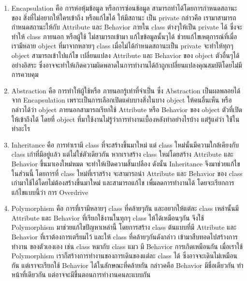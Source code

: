 \begin{enumerate}
\item Encapsulation คือ การห่อหุ้มข้อมูล หรือการซ่อนข้อมูล สามารถทำได้โดยการกำหนดสถานะของ สิ่งที่ไม่อยากให้ใครเข้าถึง หรือแก้ไขได้ ให้มีสถานะ
เป็น private กล่าวคือ เรามาสามารถกำหนดสถานะให้กับ Attribute และ Behavior ภายใน class ต่างๆให้เป็น private ได้ ซึ่งจะทำให้ class ภายนอก หรือผู้ใช้ ไม่สามารถเข้ามา
แก้ไขข้อมูลนั้นๆได้ ช่วยแก้ไขเหตุการณ์ที่เมื่อเรามีหลาย object ที่มาจากหลายๆ class เมื่อไม่ได้กำหนดสถานะเป็น private จะทำให้ทุกๆ object สามารถเข้าไปแก้ไข เปลี่ยนแปลง Attribute 
และ Behavior ของ object ตัวอื่นๆได้อย่างอิสระ ซึ่งอาจจะทำให้เกิดความผิดพลาดในการทำงานได้ถ้าถูกเปลี่ยนแปลงคุณสมบัติโดยไม่มีการควบคุม  
\item Abstraction คือ การทำให้ผู้ใช้หรือ ภายนอกรู้เท่าที่จำเป็น ซึ่ง Abstraction เป็นผลพลอยได้จาก Encapsulation เพราะเป็นการเลือกเปิดแค่บบางสิ่งในบาง object ให้คนอื่นเห็น หรือกล่าวได้ว่า
object ภายนอกสามารถเรียกใช้ Attribute หรือ Behavior ของ object ตัวที่เปิดให้เข้าถึงได้ โดยที่ object ที่มาใช้งานไม่รู้ว่าการทำงานเบื้องหลังทำอย่างไรบ้าง แต่รู้แค่ว่า ใช้ในทำอะไร
\item Inheritance คือ การทำเรามี class ที่จะสร้างขึ้นมาใหม่ แต่ class ใหม่นั้นมีความใกล้เคียงกับ class เก่าที่มีอยู่เเล้ว แต่ไม่ใช่ตัวเดียวกัน หากเราสร้าง class ใหม่โดยสร้าง Attribute และ Behavior ขึ้นมาเองใหม่หมด
จะทำให้เปิดความสิ้นเปลือง ดังนั้น Inheritance จึงมาช่วยแก้ไขในส่วนนี้ โดยการที่ class ใหม่ที่เราสร้าง จะสามารถนำ Attribute และ Behavior ของ class เก่ามาใช้ได้โดยไม่ต้องสร้างขึ้นมาใหม่ และสามารถแก้ไข เพื่มลดการทำงานได้ 
โดยจะเรียกการแก้ไขแบบนี้ว่า การ Overdrive 
\item Polymorphism คือ การที่เรามีหลายๆ class ที่คล้ายๆกัน และอยากให้แต่ละ class เหล่านั้นมี Attribute และ Behavior ที่เรียกใช้งานในทุกๆ class ให้ได้เหมือนๆกัน
จึงใช้ Polymorphism มาช่วยแก้ไขปัญหาเหล่านี้ โดยการสร้าง class ต้นแบบที่มี Attribute และ Behavior ที่เราต้องการเตรียมไว้ และให้ class ที่คล้ายๆกันดังกล่าว เข้ามาสืบทอดไปสร้างการทำงาน
ของตัวเองเอง เช่น class หมากับ class แมว มี Behavior การเกิดเหมือนกัน เมื่อเราใช้ Polymorphism เราก็สร้างการทำงานของการเดินของแต่ละ class ได้ ซึ่งอาจจะเดินไม่เหมือนกัน แต่เราจะเรียกใช้
 Behavior ได้ในลักษณะที่คล้ายกัน กล่าวคคือ Behavior มีชื่อเดียวกัน ทำหน้าที่เดียวกัน แต่อาจจะมีขึ้นตอนการทำงานคนละแบบกัน
\end{enumerate}

